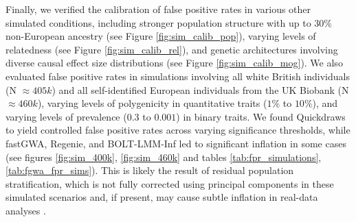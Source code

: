 %
Finally, we verified the calibration of false positive rates in various other simulated conditions, including stronger population structure with up to $30\%$ non-European ancestry (see Figure \ref{fig:sim_calib_pop}), varying levels of relatedness (see Figure \ref{fig:sim_calib_rel}), and genetic architectures involving diverse causal effect size distributions (see Figure \ref{fig:sim_calib_mog}).
%
We also evaluated false positive rates in simulations involving all white British individuals (N $\approx 405k$) and all self-identified European individuals from the UK Biobank (N $\approx 460k$), varying levels of polygenicity in quantitative traits ($1\%$ to $10\%$), and varying levels of prevalence ($0.3$ to $0.001$) in binary traits. We found Quickdraws to yield controlled false positive rates across varying significance thresholds, while fastGWA, Regenie, and BOLT-LMM-Inf led to significant inflation in some cases (see figures \ref{fig:sim_400k}, \ref{fig:sim_460k} and tables \ref{tab:fpr_simulations}, \ref{tab:fgwa_fpr_sims}).
%
This is likely the result of residual population stratification, which is not fully corrected using principal components in these simulated scenarios and, if present, may cause subtle inflation in real-data analyses \cite{haworth2019apparent,sohail2019polygenic,berg2019reduced}.

\begingroup
\renewcommand{\arraystretch}{1.2} %


